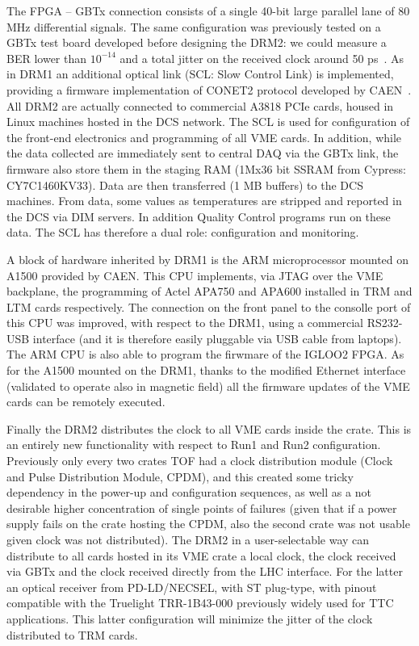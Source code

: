 The FPGA – GBTx connection consists of a single 40-bit large parallel lane of 80 MHz differential signals. The same configuration was previously tested on a GBTx test board developed before designing the DRM2: we could measure a BER lower than $10^{-14}$ and a total jitter on the received clock around 50 ps~\cite{Falchieri:2017ofi}. As in DRM1 an additional optical link (SCL: Slow Control Link) is implemented, providing a firmware implementation of CONET2 protocol developed by CAEN~\cite{CONET2}. All DRM2 are actually connected to commercial A3818 PCIe cards, housed in Linux machines hosted in the DCS network. The SCL is used for configuration of the front-end electronics and programming of all VME cards. In addition, while the data collected are immediately sent to central DAQ via the GBTx link, the firmware also store them in the staging RAM (1Mx36 bit SSRAM from Cypress: CY7C1460KV33). Data are then transferred (1 MB buffers) to the DCS machines. From data, some values as temperatures are stripped and reported in the DCS via DIM servers. In addition Quality Control programs run on these data. The SCL has therefore a dual role: configuration and monitoring.

A block of hardware inherited by DRM1 is the ARM microprocessor mounted on A1500 provided by CAEN. This CPU implements, via JTAG over the VME backplane, the programming of Actel APA750 and APA600 installed in TRM and LTM cards respectively. The connection on the front panel to the consolle port of this CPU was improved, with respect to the DRM1, using a commercial RS232-USB interface (and it is therefore easily pluggable via USB cable from laptops). The ARM CPU is also able to program the firwmare of the IGLOO2 FPGA. As for the A1500 mounted on the DRM1, thanks to the modified Ethernet interface (validated to operate also in magnetic field) all the firmware updates of the VME cards can be remotely executed.

Finally the DRM2 distributes the clock to all VME cards inside the crate. This is an entirely new functionality with respect to Run1 and Run2 configuration. Previously only every two crates TOF had a clock distribution module (Clock and Pulse Distribution Module, CPDM), and this created some tricky dependency in the power-up and configuration sequences, as well as a not desirable higher concentration of single points of failures (given that if a power supply fails on the crate hosting the CPDM, also the second crate was not usable given clock was not distributed). The DRM2 in a user-selectable way can distribute to all cards hosted in its VME crate a local clock, the clock received via GBTx and the clock received directly from the LHC interface. For the latter an optical receiver from PD-LD/NECSEL, with ST plug-type, with pinout compatible with the Truelight TRR-1B43-000 previously widely used for TTC applications. This latter configuration will minimize the jitter of the clock distributed to TRM cards.


